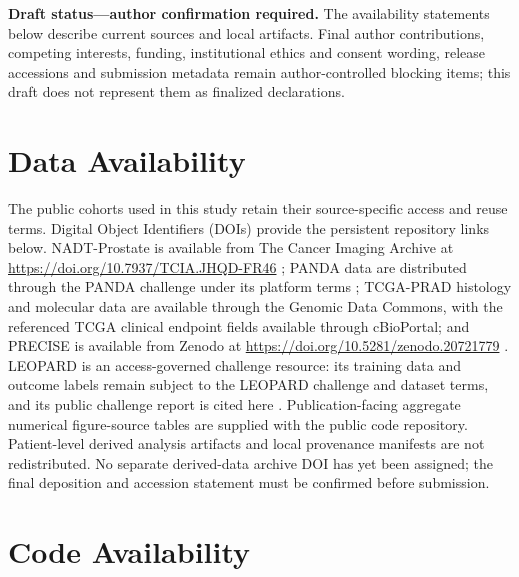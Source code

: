 \noindent\textbf{Draft status---author confirmation required.}
The availability statements below describe current sources and local artifacts. Final
author contributions, competing interests, funding, institutional ethics and consent
wording, release accessions and submission metadata remain author-controlled blocking
items; this draft does not represent them as finalized declarations.

\section*{Data Availability}

The public cohorts used in this study retain their source-specific access and reuse terms.
Digital Object Identifiers (DOIs) provide the persistent repository links below.
NADT-Prostate is available from The Cancer Imaging Archive at
\url{https://doi.org/10.7937/TCIA.JHQD-FR46} \cite{nadt2021}; PANDA data are distributed through the
PANDA challenge under its platform terms \cite{panda2022}; TCGA-PRAD histology and
molecular data are available through the Genomic Data Commons, with the referenced
TCGA clinical endpoint fields available through cBioPortal; and PRECISE is available from
Zenodo at \url{https://doi.org/10.5281/zenodo.20721779} \cite{precise2026}. LEOPARD is an
access-governed challenge resource: its training data and outcome labels remain subject to
the LEOPARD challenge and dataset terms, and its public challenge report is cited here
\cite{leopard2026}. Publication-facing aggregate numerical figure-source tables are supplied
with the public code repository. Patient-level derived analysis artifacts and local provenance
manifests are not redistributed. No separate derived-data archive DOI has yet been assigned;
the final deposition and accession statement must be confirmed before submission.

\section*{Code Availability}

